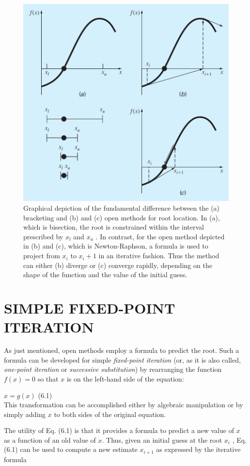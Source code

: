 \documentclass[../main.tex]{subfiles}
\begin{document}
\begin{figure}[h]
    \includegraphics[width = 0.5\linewidth]{./images/fig_6_1}
    \caption{Graphical depiction of the fundamental difference between the (a) bracketing and (b) and (c)
    open methods for root location. In (a), which is bisection, the root is constrained within the interval
    prescribed by $x_l$ and $x_u$ . In contrast, for the open method depicted in (b) and (c), which is
    Newton-Raphson, a formula is used to project from $x_i$ to $x_i+1$ in an iterative fashion. Thus the
    method can either (b) diverge or (c) converge rapidly, depending on the shape of the function
    and the value of the initial guess.}
\end{figure}
\bigskip

\section[SIMPLE FIXED-POINT ITERATION]{SIMPLE FIXED-POINT ITERATION}
\noindent As just mentioned, open methods employ a formula to predict the root. Such a formula can
be developed for simple \emph{fixed-point iteration} (or, as it is also called, \emph{one-point iteration} or
\emph{successive substitution}) by rearranging the function $f (x) = 0$ so that $x$ is on the left-hand
side of the equation:

$x = g(x)$
\hfill (6.1)\\

\noindent This transformation can be accomplished either by algebraic manipulation or by simply
adding $x$ to both sides of the original equation.

The utility of Eq. (6.1) is that it provides a formula to predict a new value of $x$ as a
function of an old value of $x$. Thus, given an initial guess at the root $x_i$ , Eq. (6.1) can be
used to compute a new estimate $x_{i+1}$ as expressed by the iterative formula\\
\end{document}

